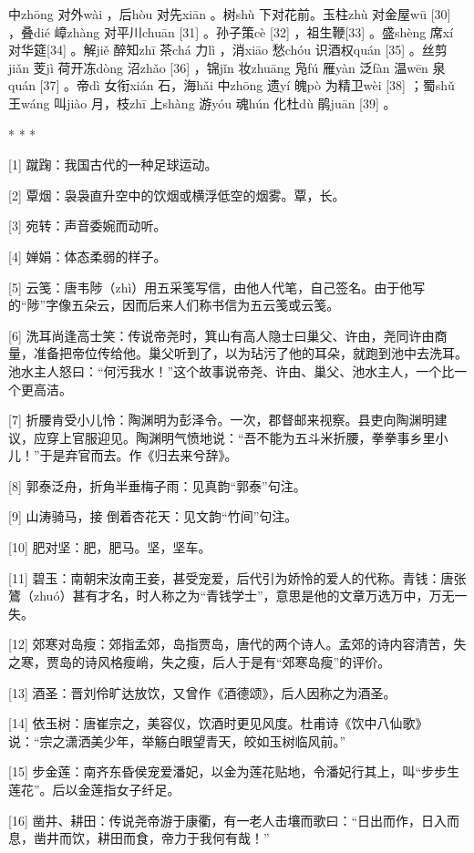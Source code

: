 \documentclass[12pt,UTF8]{ctexbook}
\begin{document}
中zhōng 对外wài ，后hòu 对先xiān 。树shù 下对花前。玉柱zhù 对金屋wū [30] ，叠dié 嶂zhàng 对平川chuān [31] 。孙子策cè [32] ，祖生鞭[33] 。盛shèng 席xí 对华筵[34] 。解jiě 醉知zhī 茶chá 力lì ，消xiāo 愁chóu 识酒权quán [35] 。丝剪jiǎn 芰jì 荷开冻dòng 沼zhǎo [36] ，锦jǐn 妆zhuāng 凫fú 雁yàn 泛fàn 温wēn 泉quán [37] 。帝dì 女衔xián 石，海hǎi 中zhōng 遗yí 魄pò 为精卫wèi [38] ；蜀shǔ 王wáng 叫jiào 月，枝zhī 上shàng 游yóu 魂hún 化杜dù 鹃juān [39] 。



* * *



[1] 蹴踘：我国古代的一种足球运动。

[2] 覃烟：袅袅直升空中的饮烟或横浮低空的烟雾。覃，长。

[3] 宛转：声音委婉而动听。

[4] 婵娟：体态柔弱的样子。

[5] 云笺：唐韦陟（zhì）用五采笺写信，由他人代笔，自己签名。由于他写的“陟”字像五朵云，因而后来人们称书信为五云笺或云笺。

[6] 洗耳尚逢高士笑：传说帝尧时，箕山有高人隐士曰巢父、许由，尧同许由商量，准备把帝位传给他。巢父听到了，以为玷污了他的耳朵，就跑到池中去洗耳。池水主人怒曰：“何污我水！”这个故事说帝尧、许由、巢父、池水主人，一个比一个更高洁。

[7] 折腰肯受小儿怜：陶渊明为彭泽令。一次，郡督邮来视察。县吏向陶渊明建议，应穿上官服迎见。陶渊明气愤地说：“吾不能为五斗米折腰，拳拳事乡里小儿！”于是弃官而去。作《归去来兮辞》。

[8] 郭泰泛舟，折角半垂梅子雨：见真韵“郭泰”句注。

[9] 山涛骑马，接 倒着杏花天：见文韵“竹间”句注。

[10] 肥对坚：肥，肥马。坚，坚车。

[11] 碧玉：南朝宋汝南王妾，甚受宠爱，后代引为娇怜的爱人的代称。青钱：唐张鷟（zhuó）甚有才名，时人称之为“青钱学士”，意思是他的文章万选万中，万无一失。

[12] 郊寒对岛瘦：郊指孟郊，岛指贾岛，唐代的两个诗人。孟郊的诗内容清苦，失之寒，贾岛的诗风格瘦峭，失之瘦，后人于是有“郊寒岛瘦”的评价。

[13] 酒圣：晋刘伶旷达放饮，又曾作《酒德颂》，后人因称之为酒圣。

[14] 依玉树：唐崔宗之，美容仪，饮酒时更见风度。杜甫诗《饮中八仙歌》说：“宗之潇洒美少年，举觞白眼望青天，皎如玉树临风前。”

[15] 步金莲：南齐东昏侯宠爱潘妃，以金为莲花贴地，令潘妃行其上，叫“步步生莲花”。后以金莲指女子纤足。

[16] 凿井、耕田：传说尧帝游于康衢，有一老人击壤而歌曰：“日出而作，日入而息，凿井而饮，耕田而食，帝力于我何有哉！”
\end{document}
